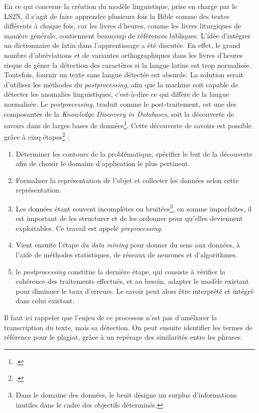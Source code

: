 \documentclass[a4paper,12pt,twoside]{book}
\begin{document}
En ce qui concerne la création du modèle linguistique, prise en charge par le LS2N, il s'agit de faire apprendre plusieurs fois la Bible comme des textes différents à chaque fois, car les livres d'heures, comme les livres liturgiques de manière générale, contiennent beaucoup de références bibliques. L'idée d'intégrer un dictionnaire de latin dans l'apprentissage a été discutée. En effet, le grand nombre d'abréviations et de variantes orthographiques dans les livres d'heures risque de gêner la détection des caractères si la langue latine est trop normalisée. Toutefois, fournir un texte sans langue détectée est absurde. La solution serait d'utiliser les méthodes du \textit{postprocessing}, afin que la machine soit capable de détecter les anomalies linguistiques, c'est-à-dire ce qui diffère de la langue normalisée. Le \textit{postprecessing}, traduit comme le \og post-traitement\fg{}, est une des composantes de la \textit{Knowledge Discovery in Databases}, soit la découverte de savoirs dans de larges bases de données\footcite[p. 1]{Postprocessing}. Cette découverte de savoirs est possible grâce à cinq étapes\footcite[p. 2]{Postprocessing} : 
\begin{enumerate}
    \item Déterminer les contours de la problématique, spécifier le but de la découverte afin de choisir le domaine d'application le plus pertinent.
    \item Formaliser la représentation de l'objet et collecter les données selon cette représentation.
    \item Les données étant souvent incomplètes ou \og bruitées\fg{}\footnote{Dans le domaine des données, le bruit désigne un surplus d'informations inutiles dans le cadre des objectifs déterminés.}, en somme imparfaites, il est important de les structurer et de les ordonner pour qu'elles deviennent exploitables. Ce travail est appelé \og \textit{preprocessing}\fg{}.
    \item Vient ensuite l'étape du \textit{data mining} pour donner du sens aux données, à l'aide de méthodes statistiques, de réseaux de neurones et d'algorithmes.
    \item le \textit{postprocessing} constitue la dernière étape, qui consiste à vérifier la cohérence des traitements effectués, et au besoin, adapter le modèle existant pour diminuer le taux d'erreurs. Le savoir peut alors être interprété et intégré dans celui existant. 
\end{enumerate}

Il faut ici rappeler que l'enjeu de ce processus n'est pas d'améliorer la transcription du texte, mais sa détection. On peut ensuite identifier les termes de référence pour le plagiat, grâce à un repérage des similarités entre les phrases. \\
\end{document}

